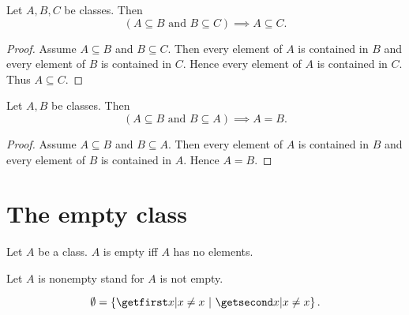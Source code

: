\documentclass[../set-theory.tex]{subfiles}
\begin{document}
  \begin{forthel}
    \begin{proposition}
      Let $A, B, C$ be classes.
      Then \[ (\text{$A \subseteq B$ and $B \subseteq C$}) \implies
      A \subseteq C. \]
    \end{proposition}
    \begin{proof}
      Assume $A \subseteq B$ and $B \subseteq C$.
      Then every element of $A$ is contained in $B$ and every element of $B$ is
      contained in $C$.
      Hence every element of $A$ is contained in $C$.
      Thus $A \subseteq C$.
    \end{proof}
  \end{forthel}

  \begin{forthel}
    \begin{proposition}
      Let $A, B$ be classes.
      Then \[ (\text{$A \subseteq B$ and $B \subseteq A$}) \implies A = B. \]
    \end{proposition}
    \begin{proof}
      Assume $A \subseteq B$ and $B \subseteq A$.
      Then every element of $A$ is contained in $B$ and every element of $B$ is
      contained in $A$.
      Hence $A = B$.
    \end{proof}
  \end{forthel}


  \section{The empty class}

  \begin{forthel}
    \begin{definition}
      Let $A$ be a class.
      $A$ is empty iff $A$ has no elements.
    \end{definition}

    Let $A$ is nonempty stand for $A$ is not empty.
  \end{forthel}

  \begin{forthel}
    \begin{definition}
      \[ \emptyset = \class{ x | x \neq x }. \]
    \end{definition}
  \end{forthel}
\end{document}
